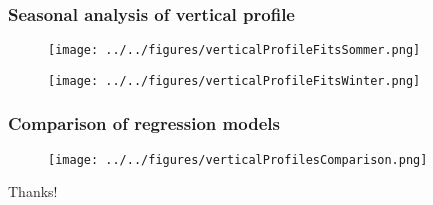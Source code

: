 \documentclass[12pt,t]{beamer}
\begin{document}
\begin{frame}[fragile]
\frametitle{Seasonal analysis of vertical profile}
\begin{figure}[htbp]
	\begin{center}
		\begin{minipage}[t]{0.49\linewidth}
			\centering
  \texttt{[image: ../../figures/verticalProfileFitsSommer.png]}
			\label{histo1}
		\end{minipage}
		\begin{minipage}[t]{0.49\linewidth}
		  \centering
  \texttt{[image: ../../figures/verticalProfileFitsWinter.png]}
			\label{histo2}
		\end{minipage}
	\end{center}
\end{figure}
\end{frame}

\begin{frame}[fragile]
\frametitle{Comparison of regression models}
\begin{figure}[H]
\centering
\texttt{[image: ../../figures/verticalProfilesComparison.png]}
\label{fig:weatherpattern}
\end{figure}
\end{frame}

\begin{frame}[fragile]
\vspace{100 pt}
\Huge
\begin{center}
Thanks!
\end{center}
\end{frame}
\end{document}
